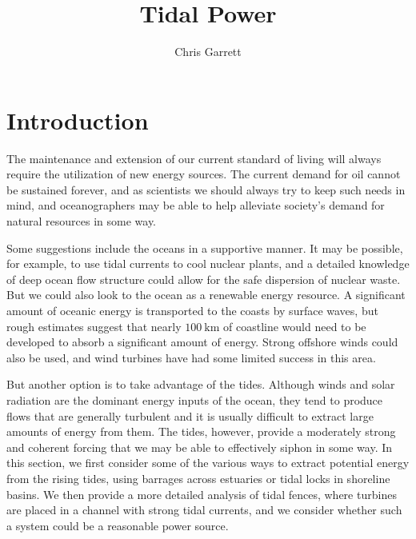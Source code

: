 \documentclass[11pt]{article}
\title{Tidal Power}
\author{Chris Garrett}
\begin{document}
\maketitle



\section{Introduction}
\label{Intro}

The maintenance and extension of our current standard of living will always require the utilization of new energy sources. The current demand for oil cannot be sustained forever, and as scientists we should always try to keep such needs in mind, and oceanographers may be able to help alleviate society's demand for natural resources in some way.

Some suggestions include the oceans in a supportive manner. It may be possible, for example, to use tidal currents to cool nuclear plants, and a detailed knowledge of deep ocean flow structure could allow for the safe dispersion of nuclear waste. But we could also look to the ocean as a renewable energy resource. A significant amount of oceanic energy is transported to the coasts by surface waves, but rough estimates suggest that nearly $100 \ \textrm{km}$ of coastline would need to be developed to absorb a significant amount of energy. Strong offshore winds could also be used, and wind turbines have had some limited success in this area.

But another option is to take advantage of the tides. Although winds and solar radiation are the dominant energy inputs of the ocean, they tend to produce flows that are generally turbulent and it is usually difficult to extract large amounts of energy from them. The tides, however, provide a moderately strong and coherent forcing that we may be able to effectively siphon in some way. In this section, we first consider some of the various ways to extract potential energy from the rising tides, using barrages across estuaries or tidal locks in shoreline basins. We then provide a more detailed analysis of tidal fences, where turbines are placed in a channel with strong tidal currents, and we consider whether such a system could be a reasonable power source.
\end{document}
